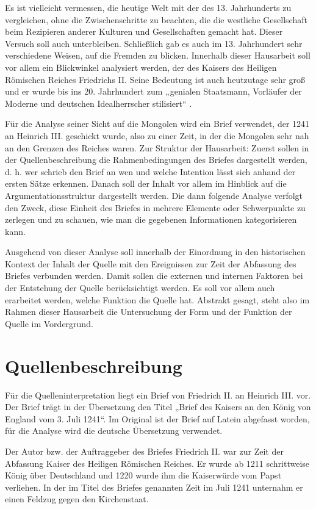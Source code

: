 \documentclass[12pt,headsepline,a4paper]{scrartcl}
\begin{document}
Es ist vielleicht vermessen, die heutige Welt mit der des 13. Jahrhunderts zu
vergleichen, ohne die Zwischenschritte zu beachten, die die westliche Gesellschaft beim
Rezipieren anderer Kulturen und Gesellschaften gemacht hat. Dieser Versuch soll auch
unterbleiben. Schließlich gab es auch im 13. Jahrhundert sehr verschiedene Weisen,
auf die Fremden zu blicken. Innerhalb dieser Hausarbeit soll vor allem ein Blickwinkel
analysiert werden, der des Kaisers des Heiligen Römischen Reiches Friedrichs II. Seine
Bedeutung ist auch heutzutage sehr groß und er wurde bis ins 20. Jahrhundert zum
„genialen Staatsmann, Vorläufer der Moderne und deutschen Idealherrscher stilisiert“ \autocite[Rückseite]{rader2010} .

Für die Analyse seiner Sicht auf die Mongolen wird ein Brief verwendet, der 1241 an
Heinrich III. geschickt wurde, also zu einer Zeit, in der die Mongolen sehr nah an den
Grenzen des Reiches waren. Zur Struktur der Hausarbeit: Zuerst sollen in der
Quellenbeschreibung die Rahmenbedingungen des Briefes dargestellt werden, d. h. wer
schrieb den Brief an wen und welche Intention lässt sich anhand der ersten Sätze
erkennen. Danach soll der Inhalt vor allem im Hinblick auf die Argumentationsstruktur
dargestellt werden.
Die dann folgende Analyse verfolgt den Zweck, diese Einheit des
Briefes in mehrere Elemente oder Schwerpunkte zu zerlegen und zu schauen, wie man
die gegebenen Informationen kategorisieren kann.

Ausgehend von dieser Analyse soll innerhalb der Einordnung in den historischen
Kontext der Inhalt der Quelle mit den Ereignissen zur Zeit der Abfassung des Briefes
verbunden werden. Damit sollen die externen und internen Faktoren bei der Entstehung
der Quelle berücksichtigt werden. Es soll vor allem auch erarbeitet werden, welche
Funktion die Quelle hat. Abstrakt gesagt, steht also im Rahmen dieser Hausarbeit die
Untersuchung der Form und der Funktion der Quelle im Vordergrund.

\section{Quellenbeschreibung}
Für die Quelleninterpretation liegt ein Brief von Friedrich II. an Heinrich III. vor.
Der Brief trägt in der Übersetzung den Titel „Brief des Kaisers an den König von
England vom 3. Juli 1241“. Im Original ist der Brief auf Latein abgefasst worden, für
die Analyse wird die deutsche Übersetzung verwendet.

Der Autor bzw. der Auftraggeber des Briefes Friedrich II. war zur Zeit der Abfassung
Kaiser des Heiligen Römischen Reiches. Er wurde ab 1211 schrittweise König über
Deutschland und 1220 wurde ihm die Kaiserwürde vom Papst verliehen. In der im Titel
des Briefes genannten Zeit im Juli 1241 unternahm er einen Feldzug gegen den
Kirchenstaat.
\end{document}
